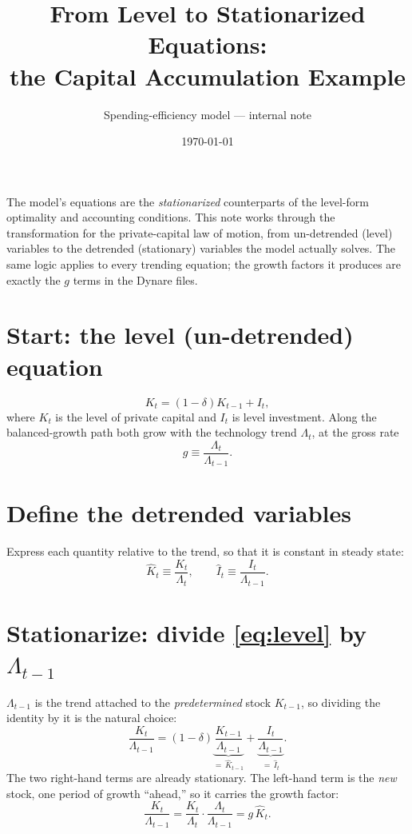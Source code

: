 \documentclass[11pt]{article}
\title{From Level to Stationarized Equations:\\ the Capital Accumulation Example}
\author{Spending-efficiency model --- internal note}
\date{\today}
\begin{document}
\maketitle

\noindent
The model's equations are the \emph{stationarized} counterparts of the level-form
optimality and accounting conditions. This note works through the transformation for
the private-capital law of motion, from un-detrended (level) variables to the detrended
(stationary) variables the model actually solves. The same logic applies to every
trending equation; the growth factors it produces are exactly the $g$ terms in the
Dynare files.

\section{Start: the level (un-detrended) equation}

\begin{equation}\label{eq:level}
    K_t = (1-\delta)K_{t-1} + I_t,
\end{equation}
where $K_t$ is the level of private capital and $I_t$ is level investment. Along the
balanced-growth path both grow with the technology trend $\Lambda_t$, at the gross rate
\begin{equation}
    g \equiv \frac{\Lambda_t}{\Lambda_{t-1}}.
\end{equation}

\section{Define the detrended variables}

Express each quantity relative to the trend, so that it is constant in steady state:
\begin{equation}
    \hat K_t \equiv \frac{K_t}{\Lambda_t}, \qquad
    \hat I_t \equiv \frac{I_t}{\Lambda_{t-1}}.
\end{equation}

\section{Stationarize: divide \eqref{eq:level} by $\Lambda_{t-1}$}

$\Lambda_{t-1}$ is the trend attached to the \emph{predetermined} stock $K_{t-1}$, so
dividing the identity by it is the natural choice:
\begin{equation}
    \frac{K_t}{\Lambda_{t-1}}
    = (1-\delta)\underbrace{\frac{K_{t-1}}{\Lambda_{t-1}}}_{=\,\hat K_{t-1}}
    + \underbrace{\frac{I_t}{\Lambda_{t-1}}}_{=\,\hat I_t}.
\end{equation}
The two right-hand terms are already stationary. The left-hand term is the \emph{new}
stock, one period of growth ``ahead,'' so it carries the growth factor:
\begin{equation}
    \frac{K_t}{\Lambda_{t-1}}
    = \frac{K_t}{\Lambda_t}\cdot\frac{\Lambda_t}{\Lambda_{t-1}}
    = g\,\hat K_t.
\end{equation}
\end{document}
